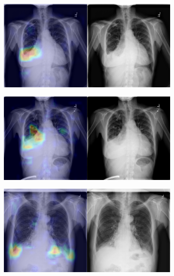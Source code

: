 \begin{figure}[b]
\begin{subfigure}{0.4\textwidth}
    \end{subfigure}
    \begin{subfigure}{0.4\textwidth}
        \centering
        \includegraphics[width=1.0\textwidth]{Chapters/5. Conclusiones/img/Effusion/1_1_00000211_008.png}
    \end{subfigure}
    \begin{subfigure}{0.4\textwidth}
        \centering
        \includegraphics[width=1.0\textwidth]{Chapters/5. Conclusiones/img/Effusion/1_1_00000211_011.png}
    \end{subfigure}
    \begin{subfigure}{0.4\textwidth}
        \centering
        \includegraphics[width=1.0\textwidth]{Chapters/5. Conclusiones/img/Effusion/1_1_00022883_011.png}

\end{subfigure}
\end{figure}
